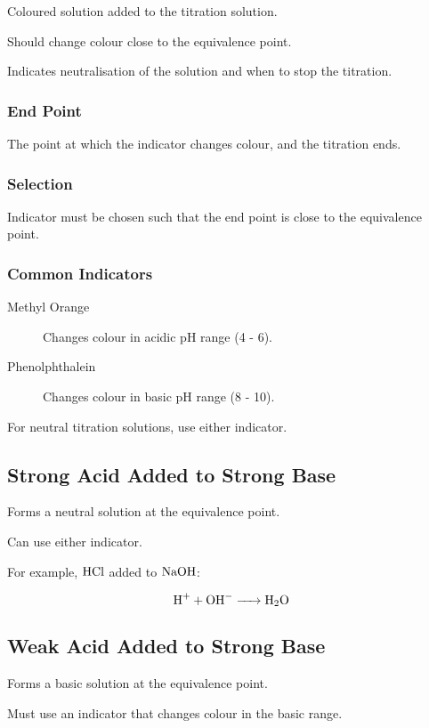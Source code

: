 \documentclass[a4paper,11pt]{article}
\begin{document}
Coloured solution added to the titration solution.

Should change colour close to the equivalence point.

Indicates neutralisation of the solution and when to stop the titration.


\subsubsection{End Point}

The point at which the indicator changes colour, and the titration ends.


\subsubsection{Selection}

Indicator must be chosen such that the end point is close to the equivalence
point.


\subsubsection{Common Indicators}

\begin{description}
\item [Methyl Orange] Changes colour in acidic pH range (4 - 6).
\item [Phenolphthalein] Changes colour in basic pH range (8 - 10).
\end{description}

For neutral titration solutions, use either indicator.


\subsection{Strong Acid Added to Strong Base}

Forms a neutral solution at the equivalence point.

Can use either indicator.

For example, $\ce{HCl}$ added to $\ce{NaOH}$:

$$
\ce{H+ + OH- -> H2O}
$$


\subsection{Weak Acid Added to Strong Base}

Forms a basic solution at the equivalence point.

Must use an indicator that changes colour in the basic range.
\end{document}
